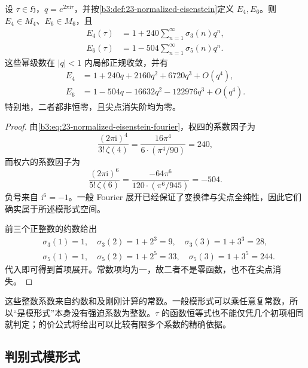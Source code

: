 \begin{proposition}\label{b3:prop:23-e4-e6}
设 \(\tau\in\mathfrak H\)，\(q=e^{2\pi\mathrm{i}\tau}\)，并按\cref{b3:def:23-normalized-eisenstein}定义 \(E_4,E_6\)。则 \(E_4\in M_4\)、\(E_6\in M_6\)，且
\begin{equation}\label{b3:eq:23-e4-e6-fourier}
 \begin{aligned}
 E_4(\tau)&=1+240\sum_{n=1}^{\infty}\sigma_3(n)q^n,\\
 E_6(\tau)&=1-504\sum_{n=1}^{\infty}\sigma_5(n)q^n.
 \end{aligned}
\end{equation}
这些幂级数在 \(|q|<1\) 内局部正规收敛，并有
\begin{equation}\label{b3:eq:23-e4-e6-initial}
 \begin{aligned}
 E_4&=1+240q+2160q^2+6720q^3+O(q^4),\\
 E_6&=1-504q-16632q^2-122976q^3+O(q^4).
 \end{aligned}
\end{equation}
特别地，二者都非恒零，且尖点消失阶均为零。
\end{proposition}
\begin{proof}
由\eqref{b3:eq:23-normalized-eisenstein-fourier}，权四的系数因子为
\[
 \frac{(2\pi\mathrm{i})^4}{3!\,\zeta(4)}
 =\frac{16\pi^4}{6\cdot(\pi^4/90)}=240,
\]
而权六的系数因子为
\[
 \frac{(2\pi\mathrm{i})^6}{5!\,\zeta(6)}
 =\frac{-64\pi^6}{120\cdot(\pi^6/945)}=-504.
\]
负号来自 \(\mathrm{i}^6=-1\)。一般 Fourier 展开已经保证了变换律与尖点全纯性，因此它们确实属于所述模形式空间。

前三个正整数的约数给出
\[
 \begin{aligned}
 &\sigma_3(1)=1,\quad \sigma_3(2)=1+2^3=9,\quad
   \sigma_3(3)=1+3^3=28,\\
 &\sigma_5(1)=1,\quad \sigma_5(2)=1+2^5=33,\quad
   \sigma_5(3)=1+3^5=244.
 \end{aligned}
\]
代入即可得到首项展开。常数项均为一，故二者不是零函数，也不在尖点消失。
\end{proof}

这些整数系数来自约数和及刚刚计算的常数。一般模形式可以乘任意复常数，所以“是模形式”本身没有强迫系数为整数。\(\tau\) 的函数恒等式也不能仅凭几个初项相同就判定；的价公式将给出可以比较有限多个系数的精确依据。

\subsection{判别式模形式}
\label{b3:subsec:230403}

